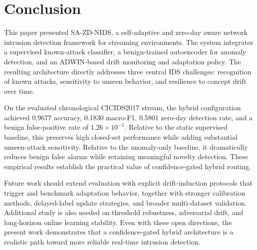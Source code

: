 \documentclass[conference]{IEEEtran}
\begin{document}
\section{Conclusion}
This paper presented SA-ZD-NIDS, a self-adaptive and zero-day aware network intrusion detection framework for streaming environments. The system integrates a supervised known-attack classifier, a benign-trained autoencoder for anomaly detection, and an ADWIN-based drift monitoring and adaptation policy. The resulting architecture directly addresses three central IDS challenges: recognition of known attacks, sensitivity to unseen behavior, and resilience to concept drift over time.

On the evaluated chronological CICIDS2017 stream, the hybrid configuration achieved 0.9677 accuracy, 0.1830 macro-F1, 0.5801 zero-day detection rate, and a benign false-positive rate of $1.26\times10^{-5}$. Relative to the static supervised baseline, this preserves high closed-set performance while adding substantial unseen-attack sensitivity. Relative to the anomaly-only baseline, it dramatically reduces benign false alarms while retaining meaningful novelty detection. These empirical results establish the practical value of confidence-gated hybrid routing.

Future work should extend evaluation with explicit drift-induction protocols that trigger and benchmark adaptation behavior, together with stronger calibration methods, delayed-label update strategies, and broader multi-dataset validation. Additional study is also needed on threshold robustness, adversarial drift, and long-horizon online learning stability. Even with these open directions, the present work demonstrates that a confidence-gated hybrid architecture is a realistic path toward more reliable real-time intrusion detection.



\end{document}
